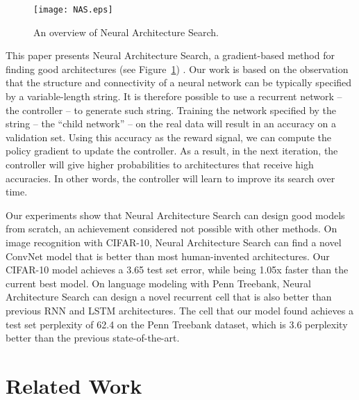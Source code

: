 \documentclass{article} \usepackage{iclr2017_conference,times}
\begin{document}
\begin{figure}[h!]
\begin{center}
\centerline{\texttt{[image: NAS.eps]}}
\caption{An overview of Neural Architecture Search.}
\label{figure:NAS}
\end{center}
\end{figure} 

This paper presents Neural Architecture Search, a gradient-based method for finding good architectures (see Figure~\ref{figure:NAS}) . Our work is based on the observation that the structure and connectivity of a neural network can be typically specified by a variable-length string. It is therefore possible to use a recurrent network -- the controller -- to generate such string. Training the network specified by the string -- the ``child network'' -- on the real data will result in an accuracy on a validation set. Using this accuracy as the reward signal, we can compute the policy gradient to update the controller. As a result, in the next iteration, the controller will give higher probabilities to architectures that receive high accuracies. In other words, the controller will learn to improve its search over time. 





Our experiments show that Neural Architecture Search can design good models from scratch, an achievement considered not possible with other methods. On image recognition with CIFAR-10, Neural Architecture Search can find a novel ConvNet model that is better than most human-invented architectures. Our CIFAR-10 model achieves a 3.65 test set error, while being 1.05x faster than the current best model. On language modeling with Penn Treebank, Neural Architecture Search can design a novel recurrent cell that is also better than previous RNN and LSTM architectures. The cell that our  model found achieves a  test set perplexity of 62.4 on the Penn Treebank dataset, which is 3.6 perplexity better than the previous state-of-the-art.











\section{Related Work}
\end{document}
